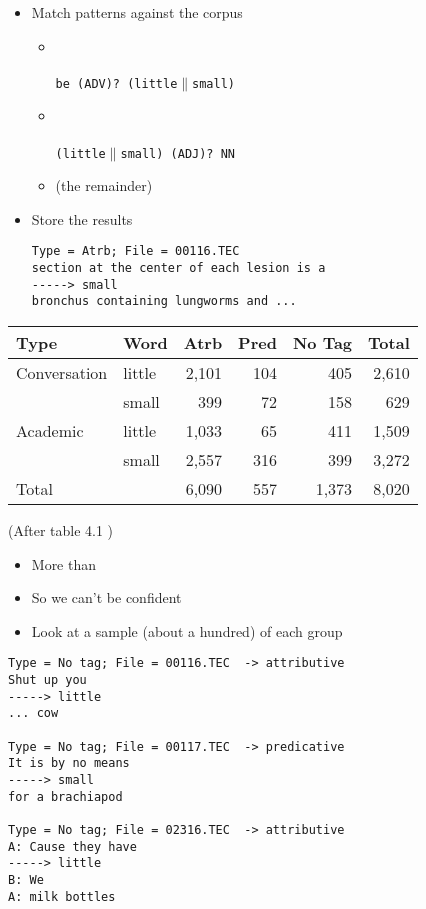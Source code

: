 \documentclass[a4paper,landscape,headrule,footrule,xetex]{foils}
\begin{document}
\begin{itemize}
\item Match patterns against the corpus
\begin{itemize}
\item {}
  \\ 
  \\ \texttt{be (ADV)? (little$\|$small)}
\item {}
  \\ 
 \\  \texttt{(little$\|$small) (ADJ)? NN}
\item {} (the remainder)
\end{itemize}
\item Store the results
\begin{verbatim}
Type = Atrb; File = 00116.TEC
section at the center of each lesion is a 
-----> small
bronchus containing lungworms and ...
\end{verbatim}
\end{itemize}


\begin{tabular}{llrrrr}
  Type & Word & Atrb & Pred & No Tag & Total \\ 
\hline\hline
Conversation & little & 2,101 & 104 & 405 & 2,610 \\
             & small &   399 & 72 & 158 & 629 \\   
\hline
Academic & little & 1,033 & 65 & 411 & 1,509 \\
             & small & 2,557 & 316 & 399 & 3,272 \\
\hline
Total  & & 6,090& 557 & 1,373 & 8,020 
\end{tabular}

(After table 4.1 \citep[p 91]{Biber:Conrad:Reppen:1998})

\begin{itemize}
\item More  than 
\item So we can't be confident
\item Look at a sample (about a hundred) of each group
  
\end{itemize}

\begin{verbatim}
Type = No tag; File = 00116.TEC  -> attributive
Shut up you 
-----> little
... cow

Type = No tag; File = 00117.TEC  -> predicative
It is by no means
-----> small
for a brachiapod

Type = No tag; File = 02316.TEC  -> attributive
A: Cause they have 
-----> little
B: We
A: milk bottles
\end{verbatim}
\end{document}
